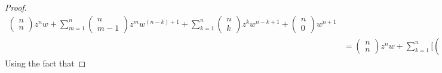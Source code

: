 \documentclass[a4paper]{article}
\begin{document}
\begin{proof}
\begin{align*}
\begin{pmatrix}
                                               n \\
                                               n 
                                              \end{pmatrix} z^{n} w + \sum_{ m=1  }^{ n } \begin{pmatrix} 
                                                         n \\
                                                         m-1
                                                     \end{pmatrix} z^{m} w^{(n-k)+1} + \sum_{ k=1 }^{ n } \begin{pmatrix} 
                                                                n \\
                                                                k 
                                                               \end{pmatrix}  z^{k } w^{n -k  + 1}  +  \begin{pmatrix} 
                                                                n \\
                                                                0  
                                                            \end{pmatrix} w^{n+1} \\
                                                            &=  \begin{pmatrix} 
                                               n \\
                                               n 
                                               \end{pmatrix} z^{n} w + \sum_{ k=1  }^{ n } \Bigg[ \begin{pmatrix} n \\ k  \end{pmatrix} + \begin{pmatrix} n \\ k - 1  \end{pmatrix}\Bigg] z^{k } w^{(n+1)-k}  +  \begin{pmatrix} 
                                                                n \\
                                                                0  
                                                            \end{pmatrix} w^{n+1}.
        \end{align*}
        Using the fact that 

\end{proof}
\end{document}
